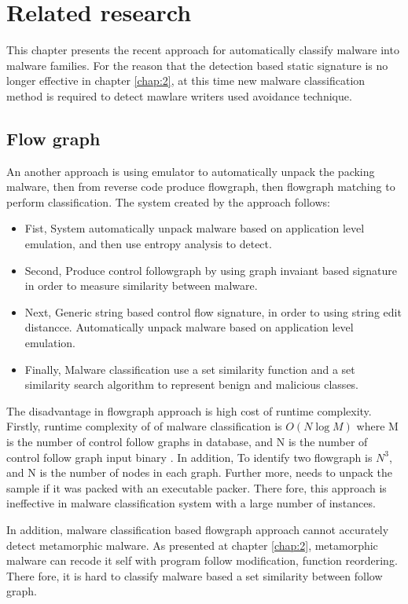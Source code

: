 \chapter{Related research}\label{chap:3}
%
%
This chapter presents the recent approach for automatically classify malware into malware families. For the reason that the detection based static signature is no longer effective in chapter \ref{chap:2}, at this time new malware classification method is required to detect mawlare writers used avoidance technique.

\section{Flow graph}
An another approach is using emulator to automatically unpack the packing malware, then from reverse code produce flowgraph, then flowgraph matching to perform classification\cite{silvio}. The system created by the approach follows:

\begin{itemize}
\item Fist, System automatically unpack malware based on application level emulation, and then use entropy analysis to detect.
\item Second, Produce control followgraph by using graph invaiant based signature in order to measure similarity between malware.
\item Next, Generic string based control flow signature, in order to using string edit distancce. Automatically unpack malware based on application level emulation.
\item Finally, Malware classification use a set similarity function and a set similarity search algorithm to represent benign and malicious classes.
\end{itemize}

The disadvantage in flowgraph approach is high cost of runtime complexity. Firstly, runtime complexity of of malware classification is $O(N\log{M})$ where M is the number of control follow graphs in database, and N is the number of control follow graph input binary \cite{silvio}. In addition, To identify two flowgraph is $N^{3}$, and N is the number of nodes in each graph. Further more, needs to unpack the sample if it was packed with an executable packer. There fore, this approach is ineffective in malware classification system with a large number of instances.

In addition, malware classification based flowgraph approach cannot accurately detect metamorphic malware. As presented at chapter \ref{chap:2}, metamorphic malware can recode it self with program follow modification, function reordering. There fore, it is hard to classify malware based a set  similarity between follow graph.
